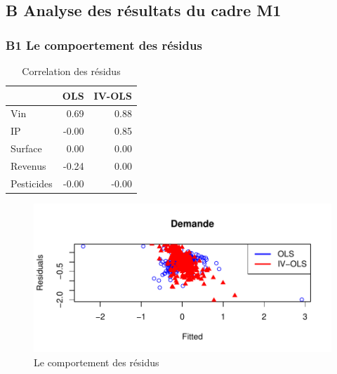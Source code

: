\documentclass[11pt,]{article}
\begin{document}
\FloatBarrier

\newpage

\hypertarget{b-analyse-des-resultats-du-cadre-m1}{%
\subsection{B Analyse des résultats du cadre
M1}\label{b-analyse-des-resultats-du-cadre-m1}}

\hypertarget{b1-le-compoertement-des-residus}{%
\subsubsection{B1 Le compoertement des
résidus}\label{b1-le-compoertement-des-residus}}

\FloatBarrier

\begin{table}[ht]
\centering
\begin{tabular}{l|rr}
  \hline
 & OLS & IV-OLS \\ 
  \hline
Vin & 0.69 & 0.88 \\ 
  IP & -0.00 & 0.85 \\ 
  Surface & 0.00 & 0.00 \\ 
  Revenus & -0.24 & 0.00 \\ 
  Pesticides & -0.00 & -0.00 \\ 
   \hline
\end{tabular}
\caption{Correlation des résidus} 
\end{table}

\FloatBarrier

\FloatBarrier

\begin{figure}[!htbp]

{\centering \includegraphics{note2pres_files/figure-latex/unnamed-chunk-60-1} 

}

\caption{Le comportement des résidus}\label{fig:unnamed-chunk-60}
\end{figure}
\end{document}
